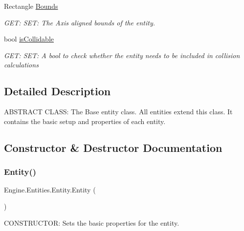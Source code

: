 \begin{DoxyCompactItemize}
Rectangle \hyperlink{a00314_a364d5fcdaee8aa472c0b8fb35830abd8}{Bounds}
\begin{DoxyCompactList}\small\item\em G\+ET\+: S\+ET\+: The Axis aligned bounds of the entity. \end{DoxyCompactList}\item 
bool \hyperlink{a00314_ae1da9f3aba0ba07c837ac2ccda590139}{is\+Collidable}
\begin{DoxyCompactList}\small\item\em G\+ET\+: S\+ET\+: A bool to check whether the entity needs to be included in collision calculations \end{DoxyCompactList}\end{DoxyCompactItemize}


\subsection{Detailed Description}
A\+B\+S\+T\+R\+A\+CT C\+L\+A\+SS\+: The Base entity class. All entities extend this class. It contains the basic setup and properties of each entity. 



\subsection{Constructor \& Destructor Documentation}
\mbox{\label{a00314_a5a3cc22ef87965c27e86f8b0867550cf}} 
\subsubsection{\texorpdfstring{Entity()}{Entity()}}
{\footnotesize\ttfamily Engine.\+Entities.\+Entity.\+Entity (\begin{DoxyParamCaption}{ }\end{DoxyParamCaption})\hspace{0.3cm}{\ttfamily [inline]}}



C\+O\+N\+S\+T\+R\+U\+C\+T\+OR\+: Sets the basic properties for the entity. 

